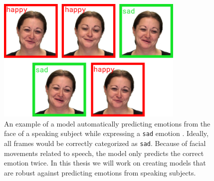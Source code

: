 \begin{figure}
    \centering
    \includegraphics[width=0.8\textwidth]{res/png_backup/mislabel.png}
    \caption{An example of a model automatically predicting emotions from the face of a speaking subject while expressing a \texttt{sad} emotion \cite{livingstone2018ryerson}. Ideally, all frames would be correctly categorized as \texttt{sad}. Because of facial movements related to speech, the model only predicts the correct emotion twice. In this thesis we will work on creating models that are robust against predicting emotions from speaking subjects.}
    \label{fig:mislabel}
\end{figure}